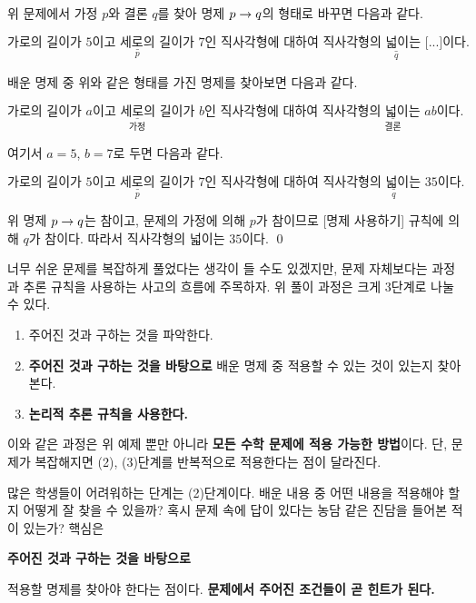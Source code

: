 \sol 위 문제에서 가정 \(p\)와 결론 \(q\)를 찾아 명제 \(p \rightarrow q\)의 형태로 바꾸면 다음과 같다.
\begin{center}
    \(\underset{p}{\underline{\text{가로의 길이가 5이고 세로의 길이가 7인 직사각형}}}\text{에 대하여 } \underset{q}{\underline{\text{직사각형의 넓이는 [...]이다.}}}\)
\end{center}
배운 명제 중 위와 같은 형태를 가진 명제를 찾아보면 다음과 같다.
\begin{center}
    \(\underset{\text{가정}}{\underline{\text{가로의 길이가 } a\text{이고 세로의 길이가 }b\text{인 직사각형}}}\text{에 대하여 } \underset{\text{결론}}{\underline{\text{직사각형의 넓이는 } ab\text{이다.}}}\)
\end{center}
여기서 \(a = 5\), \(b = 7\)로 두면 다음과 같다.
\begin{center}
    \(\underset{p}{\underline{\text{가로의 길이가 5이고 세로의 길이가 7인 직사각형}}}\text{에 대하여 } \underset{q}{\underline{\text{직사각형의 넓이는 35이다.}}}\)
\end{center}
위 명제 \(p \rightarrow q\)는 참이고, 문제의 가정에 의해 \(p\)가 참이므로 [명제 사용하기] 규칙에 의해 \(q\)가 참이다. 따라서 직사각형의 넓이는 \(35\)이다. \qed

\bigskip

너무 쉬운 문제를 복잡하게 풀었다는 생각이 들 수도 있겠지만, 문제 자체보다는 과정과 추론 규칙을 사용하는 사고의 흐름에 주목하자. 위 풀이 과정은 크게 3단계로 나눌 수 있다.

\begin{enumerate}
    \item 주어진 것과 구하는 것을 파악한다.
    \item \textbf{주어진 것과 구하는 것을 바탕으로} 배운 명제 중 적용할 수 있는 것이 있는지 찾아본다.
    \item \textbf{논리적 추론 규칙을 사용한다.}
\end{enumerate}

이와 같은 과정은 위 예제 뿐만 아니라 \textbf{모든 수학 문제에 적용 가능한 방법}이다. 단, 문제가 복잡해지면 (2), (3)단계를 반복적으로 적용한다는 점이 달라진다.

\pagebreak

많은 학생들이 어려워하는 단계는 (2)단계이다. 배운 내용 중 어떤 내용을 적용해야 할지 어떻게 잘 찾을 수 있을까? 혹시 문제 속에 답이 있다는 농담 같은 진담을 들어본 적이 있는가? 핵심은
\begin{center}
    \textbf{주어진 것과 구하는 것을 바탕으로}
\end{center}
적용할 명제를 찾아야 한다는 점이다. \textbf{문제에서 주어진 조건들이 곧 힌트가 된다.}

